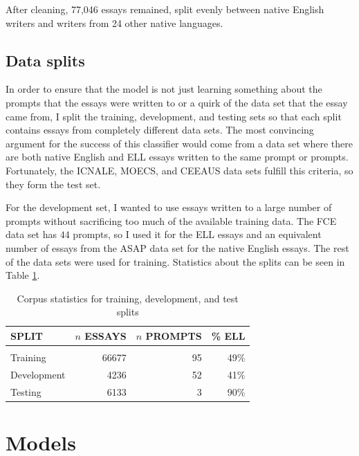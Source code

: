 \documentclass{article} %
\begin{document}
After cleaning, 77,046 essays remained, split evenly between native English
writers and writers from 24 other native languages.

\subsection{Data splits} \label{Data splits}

In order to ensure that the model is not just learning something about the prompts
that the essays were written to or a quirk of the data set that the essay came
from, I split the training, development, and testing
sets so that each split contains essays from completely different data sets.
The most convincing
argument for the success of this classifier would come from a data set where
there are both native English
and ELL essays written to the same prompt or prompts. Fortunately, the ICNALE,
MOECS, and CEEAUS data sets fulfill this criteria, so they form the test set.

For the development set, I wanted to use essays written to a large number of prompts
without sacrificing too much of the available training data. The FCE data set has
$44$ prompts, so I used it for the ELL essays and an equivalent number of essays
from the ASAP data set for the native English essays. The rest of the data sets
were used for training. Statistics about the splits can be seen in Table
\ref{splits-table}.

\begin{table}[t]
\caption{Corpus statistics for training, development, and test splits}
\label{splits-table}
\begin{center}
\begin{tabular}{l r r r}
\multicolumn{1}{l}{\bf SPLIT} &\multicolumn{1}{r}{\bf $n$ ESSAYS} &\multicolumn{1}{r}{\bf $n$ PROMPTS} &\multicolumn{1}{r}{\bf \% ELL}
\\ \hline \\
Training &  66677  & 95 & 49\%\\
Development & 4236 & 52 & 41\%\\
Testing & 6133 & 3 & 90\%\\
\end{tabular}
\end{center}
\end{table}

\section{Models} \label{models}
\end{document}
